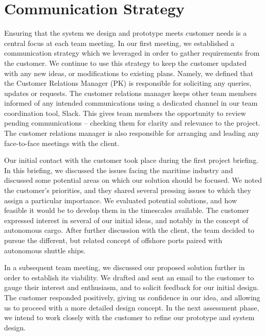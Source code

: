 \section{Communication Strategy}

Ensuring that the system we design and prototype meets customer needs is a central focus at each team meeting. In our first meeting, we established a communication strategy which we leveraged in order to gather requirements from the customer. We continue to use this strategy to keep the customer updated with any new ideas, or modifications to existing plans. Namely, we defined that the Customer Relations Manager (PK) is responsible for soliciting any queries, updates or requests. The customer relations manager keeps other team members informed of any intended communications using a dedicated channel in our team coordination tool, Slack. This gives team members the opportunity to review pending communications -- checking them for clarity and relevance to the project. The customer relations manager is also responsible for arranging and leading any face-to-face meetings with the client.

Our initial contact with the customer took place during the first project briefing. In this briefing, we discussed the issues facing the maritime industry and discussed some potential areas on which our solution should be focused. We noted the customer’s priorities, and they shared several pressing issues to which they assign a particular importance. We evaluated potential solutions, and how feasible it would be to develop them in the timescales available. The customer expressed interest in several of our initial ideas, and notably in the concept of autonomous cargo. After further discussion with the client, the team decided to pursue the different, but related concept of offshore ports paired with autonomous shuttle ships.

In a subsequent team meeting, we discussed our proposed solution further in order to establish its viability. We drafted and sent an email to the customer to gauge their interest and enthusiasm, and to solicit feedback for our initial design. The customer responded positively, giving us confidence in our idea, and allowing us to proceed with a more detailed design concept. In the next assessment phase, we intend to work closely with the customer to refine our prototype and system design.
